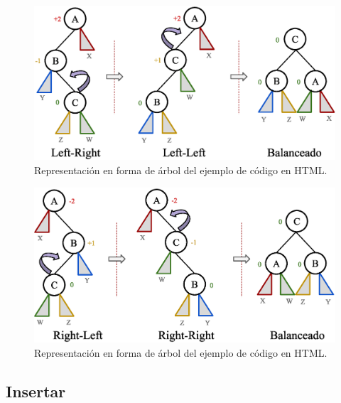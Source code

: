 \begin{figure}[htpb!]
  \begin{center}
    \includegraphics[width=1.0\textwidth]{images/AVLRotation1.eps}
  \end{center}
  \caption{Representación en forma de árbol del ejemplo de código en HTML.}
  \label{fig:AVLRotation1}
\end{figure}

\begin{figure}[htpb!]
  \begin{center}
    \includegraphics[width=1.0\textwidth]{images/AVLRotation2.eps}
  \end{center}
  \caption{Representación en forma de árbol del ejemplo de código en HTML.}
  \label{fig:AVLRotation2}
\end{figure}

\subsection{Insertar}

